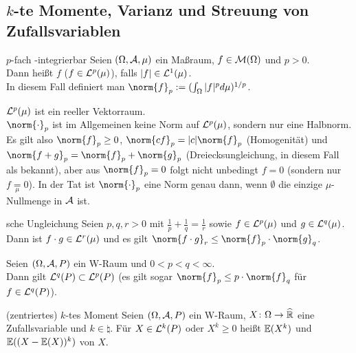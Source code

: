 \pagebreak

\subsection{%
    \texorpdfstring{$k$}{k}-te Momente, Varianz und Streuung von Zufallsvariablen%
}

\begin{Def}{$p$-fach -integrierbar}
    Seien $(\Omega, \mathcal{A}, \mu)$ ein Maßraum, $f \in \mathcal{M}(\Omega)$ und $p > 0$.\\
    Dann heißt $f$  ($f \in \mathcal{L}^p(\mu)$),
    falls $|f| \in \mathcal{L}^1(\mu)$.\\
    In diesem Fall definiert man $\norm{f}_p := (\int_\Omega |f|^p d\mu)^{1/p}$.
\end{Def}

\begin{Bem}
    $\mathcal{L}^p(\mu)$ ist ein reeller Vektorraum.\\
    $\norm{\cdot}_p$ ist im Allgemeinen keine Norm auf $\mathcal{L}^p(\mu)$, sondern nur eine Halbnorm.
    Es gilt also $\norm{f}_p \ge 0$, $\norm{c f}_p = |c| \norm{f}_p$ (Homogenität) und
    $\norm{f + g}_p = \norm{f}_p + \norm{g}_p$ (Dreiecksungleichung, in diesem Fall als
     bekannt), aber aus
    $\norm{f}_p = 0$ folgt nicht unbedingt $f = 0$
    (sondern nur $f \underset{\mu}{=} 0$).
    In der Tat ist $\norm{\cdot}_p$ eine Norm genau dann, wenn $\emptyset$ die einzige
    $\mu$-Nullmenge in $\mathcal{A}$ ist.
\end{Bem}

\begin{Satz}{sche Ungleichung}
    Seien $p, q, r > 0$ mit $\frac{1}{p} + \frac{1}{q} = \frac{1}{r}$
    sowie $f \in \mathcal{L}^p(\mu)$ und $g \in \mathcal{L}^q(\mu)$.
    Dann ist $f \cdot g \in \mathcal{L}^r(\mu)$ und es gilt
    $\norm{f \cdot g}_r \le \norm{f}_p \cdot \norm{g}_q$.
\end{Satz}

\begin{Kor}
    Seien $(\Omega, \mathcal{A}, P)$ ein W-Raum und $0 < p < q < \infty$.\\
    Dann gilt $\mathcal{L}^q(P) \subset \mathcal{L}^p(P)$
    (es gilt sogar $\norm{f}_p \le p \cdot \norm{f}_q$ für $f \in \mathcal{L}^q(P)$).
\end{Kor}

\linie

\begin{Def}{(zentriertes) $k$-tes Moment}
    Seien $(\Omega, \mathcal{A}, P)$ ein W-Raum, $X\colon \Omega \rightarrow \widehat{\mathbb{R}}$ eine Zufallsvariable
    und $k \in \natural$.
    Für $X \in \mathcal{L}^k(P)$ oder $X^k \ge 0$ heißt
    $\mathbb{E}(X^k)$  und
    $\mathbb{E}((X - \mathbb{E}(X))^k)$  von $X$.
\end{Def}

